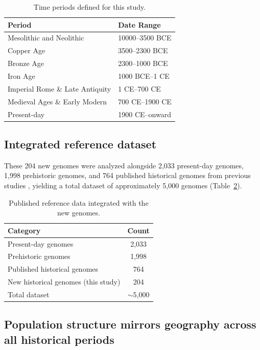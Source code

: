 \documentclass[11pt]{article}
\begin{document}
\begin{table}[ht]
\centering
\caption{Time periods defined for this study.}
\label{tab:periods}
\begin{tabular}{ll}
\toprule
Period & Date Range \\
\midrule
Mesolithic and Neolithic & 10000--3500 BCE \\
Copper Age & 3500--2300 BCE \\
Bronze Age & 2300--1000 BCE \\
Iron Age & 1000 BCE--1 CE \\
Imperial Rome \& Late Antiquity & 1 CE--700 CE \\
Medieval Ages \& Early Modern & 700 CE--1900 CE \\
Present-day & 1900 CE--onward \\
\bottomrule
\end{tabular}
\end{table}

\subsection{Integrated reference dataset}

These 204 new genomes were analyzed alongside 2,033 present-day genomes, 1,998 prehistoric genomes, and 764 published historical genomes from previous studies \citep{Lazaridis2014,Haak2015,Mathieson2015,Antonio2019,Olalde2019}, yielding a total dataset of approximately 5,000 genomes (Table~\ref{tab:reference}).

\begin{table}[ht]
\centering
\caption{Published reference data integrated with the new genomes.}
\label{tab:reference}
\begin{tabular}{lc}
\toprule
Category & Count \\
\midrule
Present-day genomes & 2,033 \\
Prehistoric genomes & 1,998 \\
Published historical genomes & 764 \\
New historical genomes (this study) & 204 \\
\midrule
Total dataset & $\sim$5,000 \\
\bottomrule
\end{tabular}
\end{table}

\subsection{Population structure mirrors geography across all historical periods}
\end{document}
